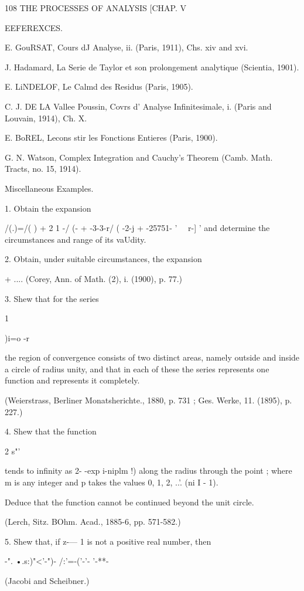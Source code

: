 {{{{108 THE PROCESSES OF ANALYSIS [CHAP. V

EEFEREXCES.

E. GouRSAT, Cours dJ Analyse, ii. (Paris, 1911), Chs. xiv and xvi.

J. Hadamard, La Serie de Taylor et son prolongement analytique
(Scientia, 1901).

E. LiNDELOF, Le Calmd des Residus (Paris, 1905).

C. J. DE LA Vallee Poussin, Covrs d' Analyse Infinitesimale, i. (Paris
and Louvain, 1914), Ch. X.

E. BoREL, Lecons stir les Fonctions Entieres (Paris, 1900).

G. N. Watson, Complex Integration and Cauchy's Theorem (Camb. Math.
Tracts, no. 15, 1914).

Miscellaneous Examples.

1. Obtain the expansion

/(.)=/( ) + 2 1 -/ (- + -3-3-r/ ( -2-j + -25751- ' \ \ r-] ' and
determine the circumstances and range of its vaUdity.

2. Obtain, under suitable circumstances, the expansion

+ .... (Corey, Ann. of Math. (2), i. (1900), p. 77.)

3. Shew that for the series

  1



)i=o -r~

the region of convergence consists of two distinct areas, namely
outside and inside a circle of radius unity, and that in each of these
the series represents one function and represents it completely.

(Weierstrass, Berliner Monatsherichte., 1880, p. 731 ; Ges. Werke, 11.
(1895), p. 227.)

4. Shew that the function

2 s"'

tends to infinity as 2- -exp i-niplm !) along the radius through the
point ; where m is any integer and p takes the values 0, 1, 2, ..'.
(ni I - 1).

Deduce that the function cannot be continued beyond the unit circle.

(Lerch, Sitz. BOhm. Acad., 1885-6, pp. 571-582.)

5. Shew that, if z-— 1 is not a positive real number, then

-". •.s:)"<'-")- /:'=-('-'- '-**-

(Jacobi and Scheibner.)



}}}}

